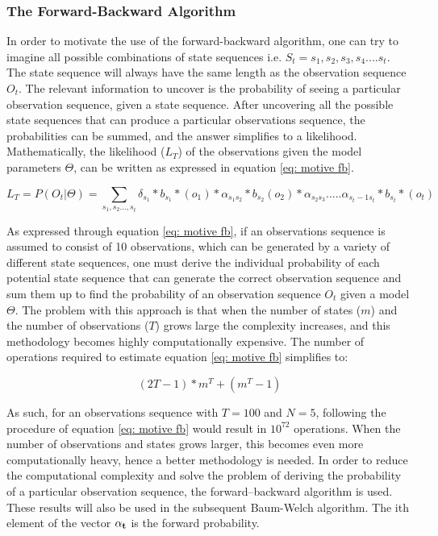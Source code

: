 \subsubsection{The Forward-Backward Algorithm}
\label{Section: Forward backward}
In order to motivate the use of the forward-backward algorithm, one can try to imagine all possible combinations of state sequences i.e. $S_t = s_1, s_2, s_3, s_4....s_t$. The state sequence will always have the same length as the observation sequence $O_t$. The relevant information to uncover is the probability of seeing a particular observation sequence, given a state sequence. After uncovering all the possible state sequences that can produce a particular observations sequence, the probabilities can be summed, and the answer simplifies to a likelihood. Mathematically, the likelihood ($L_T$) of the observations given the model parameters $\Theta$, can be written as expressed in equation \ref{eq: motive fb}.

\begin{equation}
    L_T = P(O_t|\Theta) = \sum_{s_1, s_2...,s_t} \delta_{s_1}*b_{s_1}*(o_1) * \alpha_{s_1s_2} * b_{s_2}(o_2)*\alpha_{s_2s_3} .....\alpha_{s_t-1 s_t}*b_{s_t}*(o_t)
    \label{eq: motive fb}
\end{equation}

As expressed through equation \ref{eq: motive fb}, if an observations sequence is assumed to consist of 10 observations, which can be generated by a variety of different state sequences, one must derive the individual probability of each potential state sequence that can generate the correct observation sequence and sum them up to find the probability of  an observation sequence $O_t$ given a model $\Theta$. The problem with this approach is that when the number of states ($m$) and the number of observations ($T$) grows large the complexity increases, and this methodology becomes highly computationally expensive. The number of operations required to estimate equation \ref{eq: motive fb} simplifies to:

\begin{equation}
    (2T-1)*m^T+(m^T-1)
\end{equation}

As such, for an observations sequence with $T = 100$ and $N = 5$, following the procedure of equation \ref{eq: motive fb} would result in $10^{72}$ operations. When the number of observations and states grows larger, this becomes even more computationally heavy, hence a better methodology is needed.  
In order to reduce the computational complexity and solve the problem of deriving the probability of a particular observation sequence, the forward–backward algorithm is used. These results will also be used in the subsequent Baum-Welch algorithm. The ith element of the vector $\bold{\alpha_t}$ is the forward probability.

